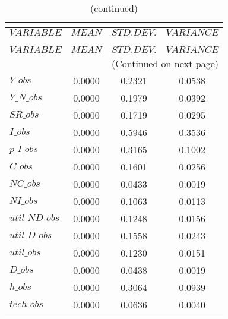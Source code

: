  
\begin{center}
\begin{longtable}{lccc} 
\caption{THEORETICAL MOMENTS}\\
 \label{Table:th_moments}\\
\toprule 
$VARIABLE       $	 & 	 $         MEAN$	 & 	 $    STD. DEV.$	 & 	 $     VARIANCE$\\
\midrule \endfirsthead 
\caption{(continued)}\\
 \toprule \\ 
$VARIABLE       $	 & 	 $         MEAN$	 & 	 $    STD. DEV.$	 & 	 $     VARIANCE$\\
\midrule \endhead 
\midrule \multicolumn{4}{r}{(Continued on next page)} \\ \bottomrule \endfoot 
\bottomrule \endlastfoot 
$Y\_obs         $	 & 	       0.0000	 & 	       0.2321	 & 	       0.0538 \\ 
$Y\_N\_obs      $	 & 	       0.0000	 & 	       0.1979	 & 	       0.0392 \\ 
$SR\_obs        $	 & 	       0.0000	 & 	       0.1719	 & 	       0.0295 \\ 
$I\_obs         $	 & 	       0.0000	 & 	       0.5946	 & 	       0.3536 \\ 
$p\_I\_obs      $	 & 	       0.0000	 & 	       0.3165	 & 	       0.1002 \\ 
$C\_obs         $	 & 	       0.0000	 & 	       0.1601	 & 	       0.0256 \\ 
$NC\_obs        $	 & 	       0.0000	 & 	       0.0433	 & 	       0.0019 \\ 
$NI\_obs        $	 & 	       0.0000	 & 	       0.1063	 & 	       0.0113 \\ 
$util\_ND\_obs  $	 & 	       0.0000	 & 	       0.1248	 & 	       0.0156 \\ 
$util\_D\_obs   $	 & 	       0.0000	 & 	       0.1558	 & 	       0.0243 \\ 
$util\_obs      $	 & 	       0.0000	 & 	       0.1230	 & 	       0.0151 \\ 
$D\_obs         $	 & 	       0.0000	 & 	       0.0438	 & 	       0.0019 \\ 
$h\_obs         $	 & 	       0.0000	 & 	       0.3064	 & 	       0.0939 \\ 
$tech\_obs      $	 & 	       0.0000	 & 	       0.0636	 & 	       0.0040 \\ 
\end{longtable}
 \end{center}

